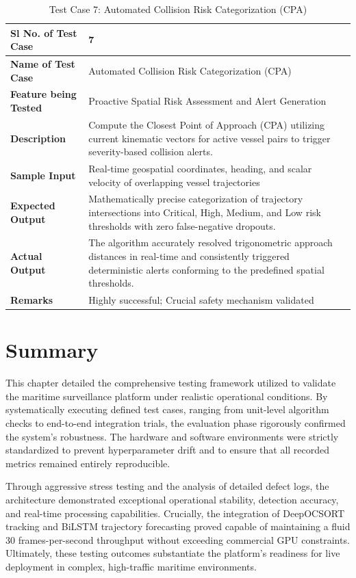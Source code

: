 \begin{table}[H]
\centering
\caption{Test Case 7: Automated Collision Risk Categorization (CPA)}
\label{tab:testcase7}
\begin{tabular}{|p{}|p{}|}
\hline
\textbf{Sl No. of Test Case} & 7 \\
\hline
\textbf{Name of Test Case} & Automated Collision Risk Categorization (CPA) \\
\hline
\textbf{Feature being Tested} & Proactive Spatial Risk Assessment and Alert Generation \\
\hline
\textbf{Description} & Compute the Closest Point of Approach (CPA) utilizing current kinematic vectors for active vessel pairs to trigger severity-based collision alerts. \\
\hline
\textbf{Sample Input} & Real-time geospatial coordinates, heading, and scalar velocity of overlapping vessel trajectories \\
\hline
\textbf{Expected Output} & Mathematically precise categorization of trajectory intersections into Critical, High, Medium, and Low risk thresholds with zero false-negative dropouts. \\
\hline
\textbf{Actual Output} & The algorithm accurately resolved trigonometric approach distances in real-time and consistently triggered deterministic alerts conforming to the predefined spatial thresholds. \\
\hline
\textbf{Remarks} & Highly successful; Crucial safety mechanism validated \\
\hline
\end{tabular}
\end{table}

\section{Summary}
This chapter detailed the comprehensive testing framework utilized to validate the maritime surveillance platform under realistic operational conditions. By systematically executing defined test cases, ranging from unit-level algorithm checks to end-to-end integration trials, the evaluation phase rigorously confirmed the system's robustness. The hardware and software environments were strictly standardized to prevent hyperparameter drift and to ensure that all recorded metrics remained entirely reproducible.

Through aggressive stress testing and the analysis of detailed defect logs, the architecture demonstrated exceptional operational stability, detection accuracy, and real-time processing capabilities. Crucially, the integration of DeepOCSORT tracking and BiLSTM trajectory forecasting proved capable of maintaining a fluid 30 frames-per-second throughput without exceeding commercial GPU constraints. Ultimately, these testing outcomes substantiate the platform's readiness for live deployment in complex, high-traffic maritime environments.
